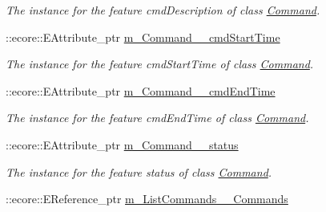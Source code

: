 \begin{DoxyCompactItemize}
\begin{DoxyCompactList}\small\item\em The instance for the feature cmdDescription of class \hyperlink{classUMS__Data_1_1Command}{Command}. \item\end{DoxyCompactList}\item 
\hypertarget{classUMS__Data_1_1UMS__DataPackage_ae22be9f27df57cd74c99cbf7709d0d38}{
::ecore::EAttribute\_\-ptr \hyperlink{classUMS__Data_1_1UMS__DataPackage_ae22be9f27df57cd74c99cbf7709d0d38}{m\_\-Command\_\-\_\-cmdStartTime}}
\label{classUMS__Data_1_1UMS__DataPackage_ae22be9f27df57cd74c99cbf7709d0d38}

\begin{DoxyCompactList}\small\item\em The instance for the feature cmdStartTime of class \hyperlink{classUMS__Data_1_1Command}{Command}. \item\end{DoxyCompactList}\item 
\hypertarget{classUMS__Data_1_1UMS__DataPackage_abe38c5cb1c2f98cb7548ecc41432dfae}{
::ecore::EAttribute\_\-ptr \hyperlink{classUMS__Data_1_1UMS__DataPackage_abe38c5cb1c2f98cb7548ecc41432dfae}{m\_\-Command\_\-\_\-cmdEndTime}}
\label{classUMS__Data_1_1UMS__DataPackage_abe38c5cb1c2f98cb7548ecc41432dfae}

\begin{DoxyCompactList}\small\item\em The instance for the feature cmdEndTime of class \hyperlink{classUMS__Data_1_1Command}{Command}. \item\end{DoxyCompactList}\item 
\hypertarget{classUMS__Data_1_1UMS__DataPackage_abcca386390f9dc8b8e9cdc0a2fbe4813}{
::ecore::EAttribute\_\-ptr \hyperlink{classUMS__Data_1_1UMS__DataPackage_abcca386390f9dc8b8e9cdc0a2fbe4813}{m\_\-Command\_\-\_\-status}}
\label{classUMS__Data_1_1UMS__DataPackage_abcca386390f9dc8b8e9cdc0a2fbe4813}

\begin{DoxyCompactList}\small\item\em The instance for the feature status of class \hyperlink{classUMS__Data_1_1Command}{Command}. \item\end{DoxyCompactList}\item 
\hypertarget{classUMS__Data_1_1UMS__DataPackage_a96f2ff42938b0b1d0511b3450b44dd5f}{
::ecore::EReference\_\-ptr \hyperlink{classUMS__Data_1_1UMS__DataPackage_a96f2ff42938b0b1d0511b3450b44dd5f}{m\_\-ListCommands\_\-\_\-Commands}}
\label{classUMS__Data_1_1UMS__DataPackage_a96f2ff42938b0b1d0511b3450b44dd5f}


\end{DoxyCompactItemize}
